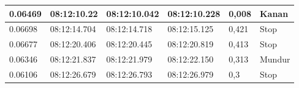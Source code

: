 \begin{longtable}{|l|l|l|l|l|l|}
  0.06469                                                                                                 & 08:12:10.22                                                                                            & 08:12:10.042                                                                                               & 08:12:10.228                                                                                            & 0,008                                              & Kanan                                             \\ \hline
  0.06698                                                                                                 & 08:12:14.704                                                                                           & 08:12:14.718                                                                                               & 08:12:15.125                                                                                            & 0,421                                              & Stop                                              \\ \hline
  0.06677                                                                                                 & 08:12:20.406                                                                                           & 08:12:20.445                                                                                               & 08:12:20.819                                                                                            & 0,413                                              & Stop                                              \\ \hline
  0.06346                                                                                                 & 08:12:21.837                                                                                           & 08:12:21.979                                                                                               & 08:12:22.150                                                                                            & 0,313                                              & Mundur                                            \\ \hline
  0.06106                                                                                                 & 08:12:26.679                                                                                           & 08:12:26.793                                                                                               & 08:12:26.979                                                                                            & 0,3                                                & Stop                                              \\ \hline

\end{longtable}
